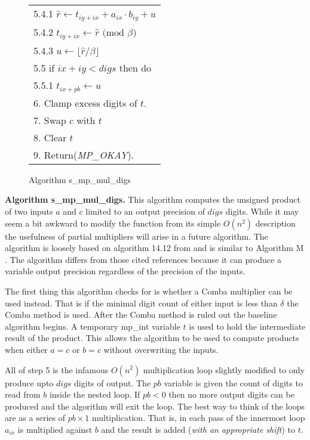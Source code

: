 \documentclass[b5paper]{book}
\begin{document}
\begin{figure}[!here]
\begin{small}
\begin{center}
\begin{tabular}{l}
\hspace{6mm}5.4.1  $\hat r \leftarrow t_{iy + ix} + a_{ix} \cdot b_{iy} + u$ \\
\hspace{6mm}5.4.2  $t_{iy + ix} \leftarrow \hat r \mbox{ (mod }\beta\mbox{)}$ \\
\hspace{6mm}5.4.3  $u \leftarrow \lfloor \hat r / \beta \rfloor$ \\
\hspace{3mm}5.5  if $ix + iy < digs$ then do \\
\hspace{6mm}5.5.1  $t_{ix + pb} \leftarrow u$ \\
6.  Clamp excess digits of $t$. \\
7.  Swap $c$ with $t$ \\
8.  Clear $t$ \\
9.  Return(\textit{MP\_OKAY}). \\
\hline
\end{tabular}
\end{center}
\end{small}
\caption{Algorithm s\_mp\_mul\_digs}
\end{figure}

\textbf{Algorithm s\_mp\_mul\_digs.}
This algorithm computes the unsigned product of two inputs $a$ and $c$ limited to an output precision of $digs$ digits.  While it may seem
a bit awkward to modify the function from its simple $O(n^2)$ description the usefulness of partial multipliers will arise in a future 
algorithm.  The algorithm is loosely based on algorithm 14.12 from \cite[pp. 595]{HAC} and is similar to Algorithm M \cite[pp. 268]{TAOCPV2}.  The
algorithm differs from those cited references because it can produce a variable output precision regardless of the precision of the inputs.

The first thing this algorithm checks for is whether a Comba multiplier can be used instead.   That is if the minimal digit count of either
input is less than $\delta$ the Comba method is used.    After the Comba method is ruled out the baseline algorithm begins.  A 
temporary mp\_int variable $t$ is used to hold the intermediate result of the product.  This allows the algorithm to be used to 
compute products when either $a = c$ or $b = c$ without overwriting the inputs.  

All of step 5 is the infamous $O(n^2)$ multiplication loop slightly modified to only produce upto $digs$ digits of output.  The $pb$ variable
is given the count of digits to read from $b$ inside the nested loop.  If $pb < 0$ then no more output digits can be produced and the algorithm
will exit the loop.  The best way to think of the loops are as a series of $pb \times 1$ multiplication.    That is, in each pass of the 
innermost loop $a_{ix}$ is multiplied against $b$ and the result is added (\textit{with an appropriate shift}) to $t$.  
\end{document}
